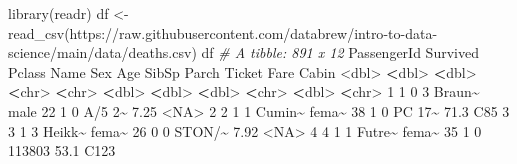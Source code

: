 \documentclass[
]{book}
\newenvironment{Shaded}{\begin{snugshade}}{\end{snugshade}}
\newcommand{\CommentTok}[1]{\textcolor[rgb]{0.56,0.35,0.01}{\textit{#1}}}
\newcommand{\ConstantTok}[1]{\textcolor[rgb]{0.00,0.00,0.00}{#1}}
\newcommand{\DecValTok}[1]{\textcolor[rgb]{0.00,0.00,0.81}{#1}}
\newcommand{\ErrorTok}[1]{\textcolor[rgb]{0.64,0.00,0.00}{\textbf{#1}}}
\newcommand{\FloatTok}[1]{\textcolor[rgb]{0.00,0.00,0.81}{#1}}
\newcommand{\FunctionTok}[1]{\textcolor[rgb]{0.00,0.00,0.00}{#1}}
\newcommand{\NormalTok}[1]{#1}
\newcommand{\OtherTok}[1]{\textcolor[rgb]{0.56,0.35,0.01}{#1}}
\newcommand{\SpecialCharTok}[1]{\textcolor[rgb]{0.00,0.00,0.00}{#1}}
\newcommand{\StringTok}[1]{\textcolor[rgb]{0.31,0.60,0.02}{#1}}
\begin{document}
\begin{Shaded}
\begin{Highlighting}[]
\FunctionTok{library}\NormalTok{(readr)}
\NormalTok{df }\OtherTok{\textless{}{-}} \FunctionTok{read\_csv}\NormalTok{(}\StringTok{\textquotesingle{}https://raw.githubusercontent.com/databrew/intro{-}to{-}data{-}science/main/data/deaths.csv\textquotesingle{}}\NormalTok{)}
\NormalTok{df}
\CommentTok{\# A tibble: 891 x 12}
\NormalTok{   PassengerId Survived Pclass Name   Sex     Age SibSp Parch Ticket  Fare Cabin}
         \SpecialCharTok{\textless{}}\NormalTok{dbl}\SpecialCharTok{\textgreater{}}    \ErrorTok{\textless{}}\NormalTok{dbl}\SpecialCharTok{\textgreater{}}  \ErrorTok{\textless{}}\NormalTok{dbl}\SpecialCharTok{\textgreater{}} \ErrorTok{\textless{}}\NormalTok{chr}\SpecialCharTok{\textgreater{}}  \ErrorTok{\textless{}}\NormalTok{chr}\SpecialCharTok{\textgreater{}} \ErrorTok{\textless{}}\NormalTok{dbl}\SpecialCharTok{\textgreater{}} \ErrorTok{\textless{}}\NormalTok{dbl}\SpecialCharTok{\textgreater{}} \ErrorTok{\textless{}}\NormalTok{dbl}\SpecialCharTok{\textgreater{}} \ErrorTok{\textless{}}\NormalTok{chr}\SpecialCharTok{\textgreater{}}  \ErrorTok{\textless{}}\NormalTok{dbl}\SpecialCharTok{\textgreater{}} \ErrorTok{\textless{}}\NormalTok{chr}\SpecialCharTok{\textgreater{}}
 \DecValTok{1}           \DecValTok{1}        \DecValTok{0}      \DecValTok{3}\NormalTok{ Braun}\SpecialCharTok{\textasciitilde{}}\NormalTok{ male     }\DecValTok{22}     \DecValTok{1}     \DecValTok{0}\NormalTok{ A}\SpecialCharTok{/}\DecValTok{5} \DecValTok{2}\SpecialCharTok{\textasciitilde{}}  \FloatTok{7.25} \SpecialCharTok{\textless{}}\ConstantTok{NA}\SpecialCharTok{\textgreater{}} 
 \DecValTok{2}           \DecValTok{2}        \DecValTok{1}      \DecValTok{1}\NormalTok{ Cumin}\SpecialCharTok{\textasciitilde{}}\NormalTok{ fema}\SpecialCharTok{\textasciitilde{}}    \DecValTok{38}     \DecValTok{1}     \DecValTok{0}\NormalTok{ PC }\DecValTok{17}\SpecialCharTok{\textasciitilde{}} \FloatTok{71.3}\NormalTok{  C85  }
 \DecValTok{3}           \DecValTok{3}        \DecValTok{1}      \DecValTok{3}\NormalTok{ Heikk}\SpecialCharTok{\textasciitilde{}}\NormalTok{ fema}\SpecialCharTok{\textasciitilde{}}    \DecValTok{26}     \DecValTok{0}     \DecValTok{0}\NormalTok{ STON}\SpecialCharTok{/}\ErrorTok{\textasciitilde{}}  \FloatTok{7.92} \SpecialCharTok{\textless{}}\ConstantTok{NA}\SpecialCharTok{\textgreater{}} 
 \DecValTok{4}           \DecValTok{4}        \DecValTok{1}      \DecValTok{1}\NormalTok{ Futre}\SpecialCharTok{\textasciitilde{}}\NormalTok{ fema}\SpecialCharTok{\textasciitilde{}}    \DecValTok{35}     \DecValTok{1}     \DecValTok{0} \DecValTok{113803} \FloatTok{53.1}\NormalTok{  C123 }

\end{Highlighting}
\end{Shaded}
\end{document}
